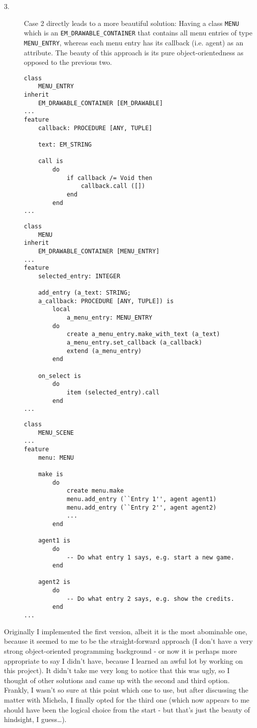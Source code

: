 \begin{description}
  \item[3.] Case 2 directly leads to a more beautiful solution: Having a class \texttt{MENU} which is an \texttt{EM\_DRAWABLE\_CONTAINER} that contains all menu entries of type \texttt{MENU\_ENTRY}, whereas each menu entry has its callback (i.e. agent) as an attribute. The beauty of this approach is its pure object-orientedness as opposed to the previous two.
    \begin{lstlisting}
class
	MENU_ENTRY
inherit
	EM_DRAWABLE_CONTAINER [EM_DRAWABLE]
...
feature
	callback: PROCEDURE [ANY, TUPLE]
	
	text: EM_STRING
	
	call is
		do
			if callback /= Void then
				callback.call ([])
			end
		end
...	
    \end{lstlisting}    
    \begin{lstlisting}
class
	MENU
inherit
	EM_DRAWABLE_CONTAINER [MENU_ENTRY]
...
feature
	selected_entry: INTEGER
	
	add_entry (a_text: STRING; 
	a_callback: PROCEDURE [ANY, TUPLE]) is
		local
			a_menu_entry: MENU_ENTRY
		do
			create a_menu_entry.make_with_text (a_text)
			a_menu_entry.set_callback (a_callback)
			extend (a_menu_entry)
		end
	
	on_select is
		do
			item (selected_entry).call
		end
...      
    \end{lstlisting}
    \begin{lstlisting}
class
	MENU_SCENE
...
feature
	menu: MENU
	
	make is
		do
			create menu.make
			menu.add_entry (``Entry 1'', agent agent1)
			menu.add_entry (``Entry 2'', agent agent2)
			...
		end

	agent1 is
		do
			-- Do what entry 1 says, e.g. start a new game.
		end
	
	agent2 is
		do
			-- Do what entry 2 says, e.g. show the credits.
		end
...		
    \end{lstlisting}
\end{description}

Originally I implemented the first version, albeit it is the most abominable one, because it seemed to me to be the straight-forward approach (I don't have a very strong object-oriented programming background - or now it is perhaps more appropriate to say I didn't have, because I learned an awful lot by working on this project). It didn't take me very long to notice that this was ugly, so I thought of other solutions and came up with the second and third option. Frankly, I wasn't so sure at this point which one to use, but after discussing the matter with Michela, I finally opted for the third one (which now appears to me should have been the logical choice from the start - but that's just the beauty of hindsight, I guess\ldots).

